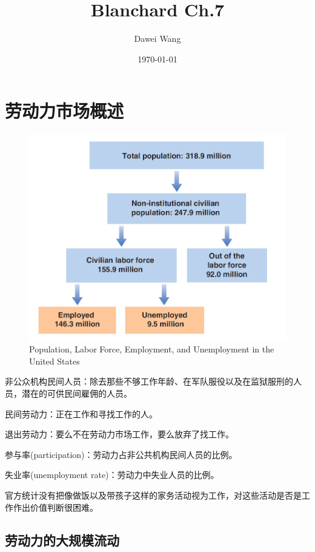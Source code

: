 \documentclass{article}
\title{Blanchard Ch.7}
\author{Dawei Wang}
\date{\today}
\begin{document}
	\maketitle
\section{劳动力市场概述}

\begin{figure}[H] %
	\centering %
	\includegraphics[width=1\textwidth]{7_1} %
	\caption{Population, Labor
		Force, Employment,
		and Unemployment in
		the United States} %
	\label{Fig.main2} %
\end{figure}

非公众机构民间人员：除去那些不够工作年龄、在军队服役以及在监狱服刑的人员，潜在的可供民间雇佣的人员。

民间劳动力：正在工作和寻找工作的人。

退出劳动力：要么不在劳动力市场工作，要么放弃了找工作。

参与率(participation)：劳动力占非公共机构民间人员的比例。

失业率(unemployment rate)：劳动力中失业人员的比例。

官方统计没有把像做饭以及带孩子这样的家务活动视为工作，对这些活动是否是工作作出价值判断很困难。

\subsection{劳动力的大规模流动}
\end{document}
